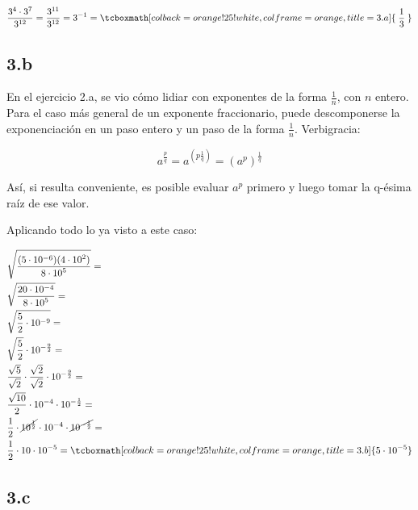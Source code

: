 \documentclass{article}
\begin{document}
\begin{equation}
\frac{3^4 \cdot 3^7}{3^{12}} = \frac{3^{11}}{3^{12}} = 3^{-1} = \tcboxmath[colback=orange!25!white,colframe=orange, title=3.a] { \hspace{0.25em} \frac{1}{3} \hspace{0.25em} }
\end{equation}

\subsection*{3.b}
\label{subsec:3.b}

En el ejercicio 2.a, se vio cómo lidiar con exponentes de la forma $\frac{1}{n}$, con $n$ entero. Para el caso más general de un exponente fraccionario, puede descomponerse la exponenciación en un paso entero y un paso de la forma $\frac{1}{n}$. Verbigracia:

\begin{equation}
a^{\frac{p}{q}} = a^{(p \frac{1}{q})} = (a^p)^{\frac{1}{q}}
\end{equation}

Así, si resulta conveniente, es posible evaluar $a^p$ primero y luego tomar la q-ésima raíz de ese valor.

Aplicando todo lo ya visto a este caso:

\begin{subequations}
\begin{align}
& \sqrt{ \frac{ (5 \cdot 10^{-6}) (4 \cdot {10}^2) }{8 \cdot {10}^5} } = \\
& \sqrt{ \frac{ 20 \cdot 10^{-4} }{8 \cdot {10}^5} } = \\
& \sqrt{ \frac{5}{2} \cdot 10^{-9} } = \\
& \sqrt{ \frac{5}{2} } \cdot 10^{-\frac{9}{2}} = \\
& \frac{\sqrt{5}}{\sqrt{2}} \cdot \frac{\sqrt{2}}{\sqrt{2}} \cdot 10^{-\frac{9}{2}} = \\
& \frac{\sqrt{10}}{2} \cdot 10^{-4} \cdot 10^{-\frac{1}{2}} = \\
& \frac{1}{2} \cdot \cancel{10^{\frac{1}{2}}} \cdot 10^{-4} \cdot \cancel{10^{-\frac{1}{2}}} = \\
& \frac{1}{2} \cdot 10 \cdot 10^{-5} = \tcboxmath[colback=orange!25!white,colframe=orange, title=3.b] { 5 \cdot 10^{-5} }
\end{align}
\end{subequations}

\subsection*{3.c}
\label{subsec:3.c}
\end{document}
